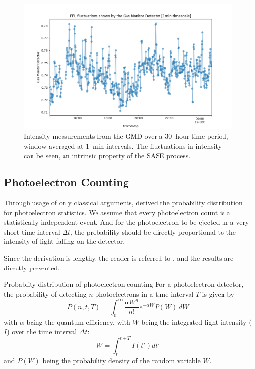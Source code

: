 \begin{figure}
    \centering
    \includegraphics[width=0.7\linewidth]{images/2024-08-16-13-56-32.png}
    \caption{Intensity measurements from the \gls{GMD} over a \qty{30}{hour} time period, window-averaged at \qty{1}{min} intervals. The fluctuations in intensity can be seen, an intrinsic property of the \gls{SASE} process.}
    \label{fig:gmd-intensity}
\end{figure}

\subsection{Photoelectron Counting}
Through usage of only classical arguments, \citeauthor{mandelFluctuationsPhotonBeams1958} \cite{mandelFluctuationsPhotonBeams1958,mandelFluctuationsPhotonBeams1959} derived the probability distribution for photoelectron statistics. We assume that every photoelectron count is a statistically independent event. And for the photoelectron to be ejected in a very short time interval $\Delta t$, the probability should be directly proportional to the intensity of light falling on the detector.

Since the derivation is lengthy, the reader is referred to \cite{mehtaVIIITheoryPhotoelectron1970}, and the results are directly presented.
\begin{note}
    {Probablity distribution of photoelectron counting}
    For a photoelectron detector, the probability of detecting $n$ photoelectrons in a time interval $T$ is given by
    \begin{equation}\label{eq:mandel-photo-electron}
        P(n, t, T) = \int_{0}^{\infty} \frac{\alpha W^n}{n!} e^{-\alpha W} P(W) \, dW
    \end{equation}
    with $\alpha$ being the quantum efficiency, with $W$ being the integrated light intensity ($I$) over the time interval $\Delta t$:
    \begin{equation}
        W = \int_{t}^{t+T} I(t') dt'
    \end{equation}
    and $P(W)$ being the probability density of the random variable $W$.
\end{note}

